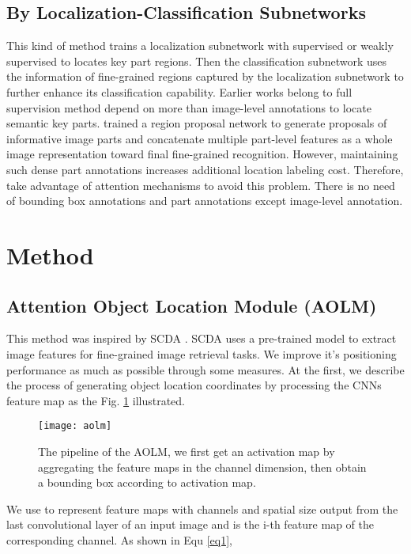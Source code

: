\documentclass[runningheads]{llncs}
\begin{document}
\subsection{By Localization-Classification Subnetworks}
This kind of method trains a localization subnetwork with supervised or weakly supervised to locates key part regions. Then the classification subnetwork uses the information of fine-grained regions captured by the localization subnetwork to further enhance its classification capability. Earlier works \cite{zhang2016spda,wei2016mask,lam2017fine} belong to full supervision method depend on more than image-level annotations to locate semantic key parts. \cite{lam2017fine} trained a region proposal network to generate proposals of informative image parts and concatenate multiple part-level features as a whole image representation toward final fine-grained recognition. However, maintaining such dense part annotations increases additional location labeling cost.
Therefore, \cite{zhao2017diversified,zheng2017learning,yang2018learning,zheng2019looking} take advantage of attention mechanisms to avoid this problem. There is no need of bounding box annotations and part annotations except image-level annotation.
\section{Method}
\subsection{Attention Object Location Module (AOLM)}
This method was inspired by SCDA \cite{wei2017selective}. SCDA uses a pre-trained model to extract image features for fine-grained image retrieval tasks. We improve it's positioning performance as much as possible through some measures. At the first, we describe the process of generating object location coordinates by processing the CNNs feature map as the Fig. \ref{fg2} illustrated. 
\begin{figure}
\texttt{[image: aolm]}
\caption{The pipeline of the AOLM, we first get an activation map by aggregating the feature maps in the channel dimension, then obtain a bounding box according to activation map.} \label{fg2}
\end{figure}

We use   to represent feature maps with  channels and spatial size  output from the last convolutional layer of an input image  and  is the i-th feature map of the corresponding channel. As shown in Equ \ref{eq1}, 
\end{document}
